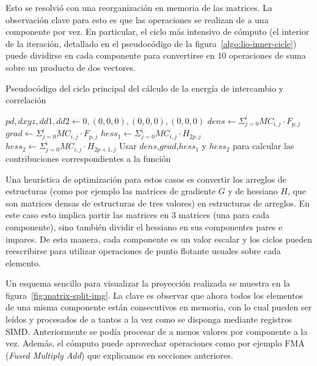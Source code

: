 Esto se resolvi\'o con una reorganizaci\'on en memoria de las matrices. La observaci\'on clave
para esto es que las operaciones se realizan de a una componente por vez. En particular,
el ciclo m\'as intensivo de c\'omputo (el interior de la iteraci\'on, detallado en el pseudoc\'odigo
de la figura~\ref{algo:lio-inner-cicle}) puede dividirse
en cada componente para convertirse en 10 operaciones de suma sobre un producto de
dos vectores.

\begin{algorithm}[H]
        \caption{Pseudoc\'odigo del ciclo principal del c\'alculo de la energ\'ia de intercambio y correlaci\'on}
        \label{algo:lio-inner-cicle}
        \begin{algorithmic}
                  \State $pd, dxyz,dd1,dd2 \gets 0, (0,0,0), (0,0,0), (0,0,0)$
                     \State $dens \gets \Sigma_{j = 0}^{i} MC_{i,j} \cdot F_{p,j}$
                     \State $grad \gets \Sigma_{j = 0}^{i} MC_{i,j} \cdot F_{p,j}$
                     \State $hess_1 \gets \Sigma_{j = 0}^{i} MC_{i,j} \cdot H_{2p,j}$
                     \State $hess_2 \gets \Sigma_{j = 0}^{i} MC_{i,j} \cdot H_{2p+1,j}$
                  \EndFor
                  \State Usar $dens$,$grad$,$hess_1$ y $hess_2$ para calcular las
                  contribuciones correspondientes a la funci\'on
              \EndFor
            \EndFunction
        \end{algorithmic}
\end{algorithm}

Una heur\'istica de optimizaci\'on para estos casos es convertir los arreglos de
estructuras (como por ejemplo las matrices de gradiente $G$ y de hessiano $H$, que
son matrices densas de estructuras de tres valores) en estructuras de arreglos.
En este caso esto implica partir las matrices en 3 matrices (una para cada
componente), sino tambi\'en dividir el hessiano en sus componentes pares e impares.
De esta manera, cada componente es un valor escalar y los ciclos pueden reescribirse
para utilizar operaciones de punto flotante usuales sobre cada elemento.

Un esquema sencillo para visualizar la proyecci\'on realizada se muestra en
la figura~\ref{fig:matrix-split-img}. La clave es observar que ahora todos los
elementos de una misma componente est\'an consecutivos en memoria, con lo cual
pueden ser le\'idos y procesados de a tantos a la vez como se disponga mediante
registros SIMD. Anteriormente se pod\'ia procesar de a menos valores por
componente a la vez. Adem\'as, el c\'omputo puede aprovechar operaciones como
por ejemplo FMA (\textit{Fused Multiply Add}) que explicamos en secciones
anteriores.

